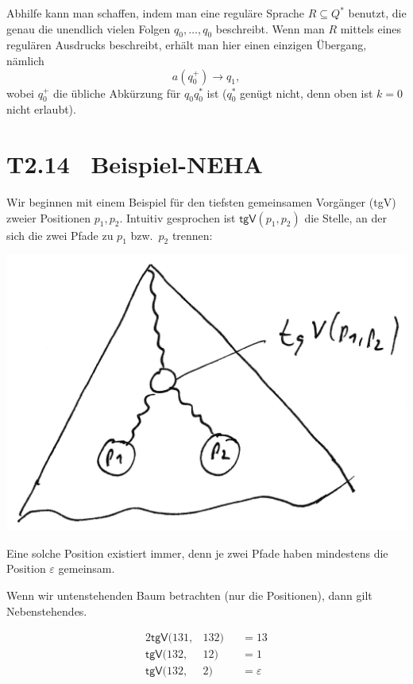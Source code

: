 \documentclass[fontsize=11pt, twoside=false, numbers=autoenddot]{scrbook}
\begin{document}
Abhilfe kann man schaffen, indem man eine reguläre Sprache $R \subseteq Q^*$ benutzt,
die genau die unendlich vielen Folgen $q_0,\dots,q_0$ beschreibt.
Wenn man $R$ mittels eines regulären Ausdrucks beschreibt,
erhält man hier einen einzigen Übergang, nämlich
\[
  a(q_0^+) \to q_1,
\]
wobei $q_0^+$ die übliche Abkürzung für $q_0q_0^*$ ist
($q_0^*$ genügt nicht, denn oben ist $k = 0$ nicht erlaubt).

\section*{T2.14~ Beispiel-NEHA}

Wir beginnen mit einem Beispiel für den tiefsten gemeinsamen Vorgänger (tgV)
zweier Positionen $p_1,p_2$. Intuitiv gesprochen ist $\textsf{tgV}(p_1,p_2)$
die Stelle, an der sich die zwei Pfade zu $p_1$ bzw.\ $p_2$ trennen:
%
\begin{center}
  \includegraphics[width=.4\linewidth]{img/t2_14.pdf}%
\end{center}
%
Eine solche Position existiert immer, denn je zwei Pfade haben mindestens
die Position $\varepsilon$ gemeinsam.

Wenn wir untenstehenden Baum betrachten (nur die Positionen),
dann gilt Nebenstehendes.
\parII
\hspace*{10mm}
\parbox{.5\linewidth}{%
}%
\parbox{.3\linewidth}{
  \begin{alignat*}{2}
    \textsf{tgV}(131,{}& 132) & & = 13 \\
    \textsf{tgV}(132,{}& 12)  & & = 1 \\
    \textsf{tgV}(132,{}& 2)   & & = \varepsilon
  \end{alignat*}
}
\end{document}
